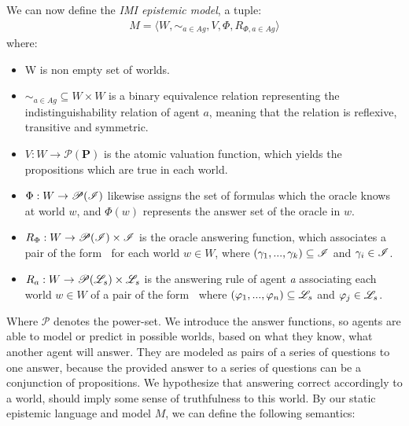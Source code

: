 We can now define the \textit{IMI epistemic model}, a tuple:
\begin{align}
	M = \langle W, \sim_{a\in Ag}, V, \Phi, R_{\Phi, a\in Ag}\rangle
\end{align}
where:
\begin{itemize}
	\setlength\itemsep{-0.4em}
	\item W is non empty set of worlds.
	\item $\sim_{a\in Ag} \subseteq W \times W$ is a binary equivalence relation representing the indistinguishability relation of agent $a$, meaning that the relation is reflexive, transitive and symmetric.
	\item $V : W \rightarrow \mathscr{P}(\mathbf{P})$ is the atomic valuation function, which yields the propositions which are true in each world. 
	\item $\Phi : W \rightarrow \mathscr{P}(\mathscr{I}) $ likewise assigns the set of formulas which the oracle knows at world $w$, and $\Phi(w)$ represents the answer set of the oracle in $w$.
	\item $R_{\Phi} : W \rightarrow \mathscr{P}(\mathscr{I}) \times \mathscr{I}$ is the oracle answering function, which associates a pair of the form \oset $\:$ for each world $w \in W$, where $(\gamma_1,...,\gamma_k) \subseteq \mathscr{I}$ and $\gamma_i \in \mathscr{I}$.
	\item $R_a : W \rightarrow \mathscr{P}(\mathscr{L}_s) \times \mathscr{L}_s$ is the answering rule of agent \textit{a} associating each world $w \in W$ of a pair of the form \aset $\:$ where $(\varphi_1,...,\varphi_n) \subseteq \mathscr{L}_s$ and $\varphi_j \in \mathscr{L}_s$.
\end{itemize}
Where $\mathscr{P}$ denotes the power-set. We introduce the answer functions, so agents are able to model or predict in possible worlds, based on what they know, what another agent will answer. They are modeled as pairs of a series of questions to one answer, because the provided answer to a series of questions can be a conjunction of propositions. We hypothesize that answering correct accordingly to a world, should imply some sense of truthfulness to this world. By our static epistemic language \staticlang\: and model $M$, we can define the following semantics:

